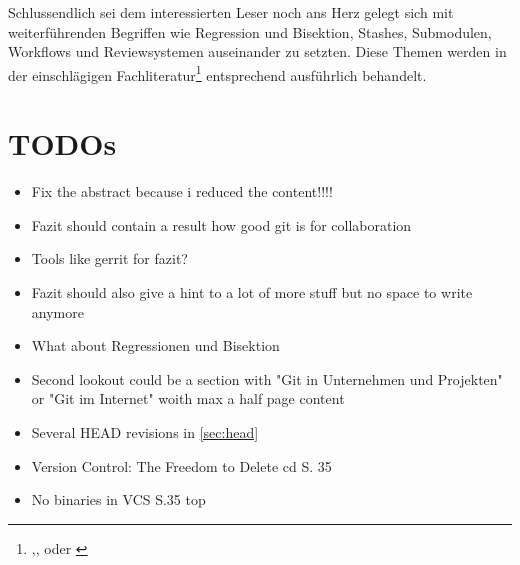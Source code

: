 Schlussendlich sei dem interessierten Leser noch ans Herz gelegt sich mit
weiterführenden Begriffen wie Regression und Bisektion, Stashes, Submodulen,
Workflows und Reviewsystemen auseinander zu setzten. Diese Themen werden in der
einschlägigen Fachliteratur\footnote{\cite{gitosp},\cite{progit},\cite{gitwf}
oder \cite{cd}} entsprechend ausführlich behandelt.

\chapter{TODOs}
\begin{itemize}
\item Fix the abstract because i reduced the content!!!!
\item Fazit should contain a result how good git is for collaboration 
\item Tools like gerrit for fazit?
\item Fazit should also give a hint to a lot of more stuff but no space to write anymore 
\item What about Regressionen und Bisektion
\item Second lookout could be a section with "Git in Unternehmen und Projekten"
or "Git im Internet" woith max a half page content
\item Several HEAD revisions in \ref{sec:head}
\item Version Control: The Freedom to Delete cd S. 35
\item No binaries in VCS S.35 top
\end{itemize}
